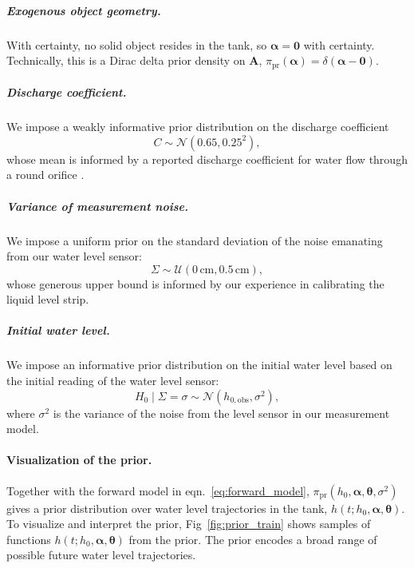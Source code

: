 \documentclass[openacc]{rsproca_new}%
\newcommand\themodel {$h(t; h_0, \boldsymbol \alpha, \boldsymbol\theta)$\xspace}
\begin{document}
\vspace{-\baselineskip}
\subparagraph{Exogenous object geometry.}
With certainty, no solid object resides in the tank, so $\boldsymbol \alpha=\mathbf{0}$ with certainty. Technically, this is a Dirac delta prior density on $\mathbf{A}$, $\pi_{\text{pr}}(\boldsymbol \alpha)=\delta(\boldsymbol \alpha - \mathbf{0})$. 




\vspace{-\baselineskip}
\subparagraph{Discharge coefficient.} 
We impose a weakly informative prior distribution on the discharge coefficient
\begin{equation}
	C \sim \mathcal{N}(0.65, 0.25^2),
\end{equation} whose mean is informed by a reported discharge coefficient for water flow through a round orifice \cite{hicks2014determining}. 

\vspace{-\baselineskip}
\subparagraph{Variance of measurement noise.} 
We impose a uniform prior on the standard deviation of the noise emanating from our water level sensor:
\begin{equation}
\Sigma \sim \mathcal{U}(0\,\text{cm}, 0.5\,\text{cm}),
\end{equation} whose generous upper bound is informed by our experience in calibrating the liquid level strip. 

\vspace{-\baselineskip}
\subparagraph{Initial water level.} We impose an informative prior distribution on the initial water level based on the initial reading of the water level sensor:
\begin{equation}
	H_0 \mid \Sigma=\sigma \sim \mathcal{N}(h_{0, \text{obs}}, \sigma^2),
\end{equation} where $\sigma^2$ is the variance of the noise from the level sensor in our measurement model.

\paragraph{Visualization of the prior.}
Together with the forward model in eqn.~\ref{eq:forward_model}, $\pi_{\text{pr}}(h_0, \boldsymbol \alpha, \boldsymbol \theta, \sigma^2)$ gives a prior distribution over water level trajectories in the tank, \themodel. 
To visualize and interpret the prior, Fig~\ref{fig:prior_train} shows samples of functions \themodel from the prior. The prior encodes a broad range of possible future water level trajectories. 
\end{document}

